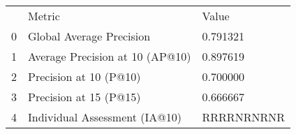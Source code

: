 \begin{tabular}{lll}
 & Metric & Value \\
0 & Global Average Precision & 0.791321 \\
1 & Average Precision at 10 (AP@10) & 0.897619 \\
2 & Precision at 10 (P@10) & 0.700000 \\
3 & Precision at 15 (P@15) & 0.666667 \\
4 & Individual Assessment (IA@10) & RRRRNRNRNR \\
\end{tabular}
